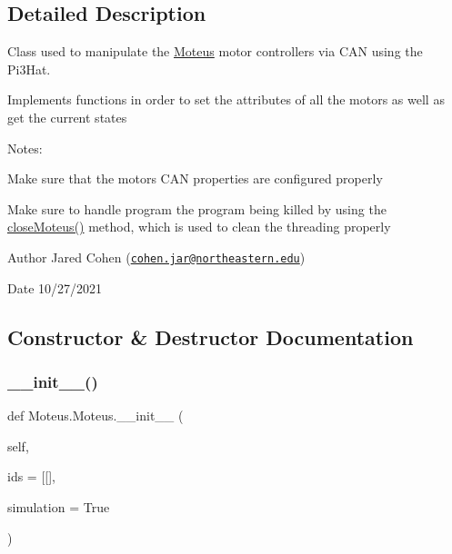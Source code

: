 \subsection{Detailed Description}
Class used to manipulate the \hyperlink{classMoteus_1_1Moteus}{Moteus} motor controllers via C\+AN using the Pi3\+Hat. 

Implements functions in order to set the attributes of all the motors as well as get the current states

Notes\+:
\begin{DoxyItemize}
\item Make sure that the motors C\+AN properties are configured properly
\item Make sure to handle program the program being killed by using the \hyperlink{classMoteus_1_1Moteus_a2e5bafddee5cfb9833f14ebf5e12f354}{close\+Moteus()} method, which is used to clean the threading properly
\end{DoxyItemize}

\begin{DoxyAuthor}{Author}
Jared Cohen (\href{mailto:cohen.jar@northeastern.edu}{\tt cohen.\+jar@northeastern.\+edu}) 
\end{DoxyAuthor}
\begin{DoxyDate}{Date}
10/27/2021 
\end{DoxyDate}


\subsection{Constructor \& Destructor Documentation}
\mbox{\label{classMoteus_1_1Moteus_a9ef12c6e83e497055dd6ee037808dc30}} 
\subsubsection{\texorpdfstring{\+\_\+\+\_\+init\+\_\+\+\_\+()}{\_\_init\_\_()}}
{\footnotesize\ttfamily def Moteus.\+Moteus.\+\_\+\+\_\+init\+\_\+\+\_\+ (\begin{DoxyParamCaption}\item[{}]{self,  }\item[{}]{ids = {\ttfamily \mbox{[}\mbox{[}\mbox{]}},  }\item[{}]{simulation = {\ttfamily True} }\end{DoxyParamCaption})}



